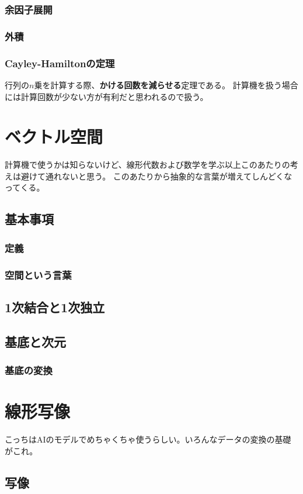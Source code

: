 \documentclass[10pt]{jsreport}
\theoremstyle{definition}%
\numberwithin{equation}{section}%
\begin{document}
\subsubsection{余因子展開}\label{yoinshi}
\subsubsection{外積}
\subsubsection{Cayley-Hamiltonの定理}
行列の$n$乗を計算する際、{\bf かける回数を減らせる}定理である。
計算機を扱う場合には計算回数が少ない方が有利だと思われるので扱う。
\section{ベクトル空間}
計算機で使うかは知らないけど、線形代数および数学を学ぶ以上このあたりの考えは避けて通れないと思う。
このあたりから抽象的な言葉が増えてしんどくなってくる。
\subsection{基本事項}
\subsubsection{定義}
\subsubsection{空間という言葉}
\subsection{1次結合と1次独立}
\subsection{基底と次元}
\subsubsection{基底の変換}
\section{線形写像}
こっちはAIのモデルでめちゃくちゃ使うらしい。いろんなデータの変換の基礎がこれ。
\subsection{写像}
\end{document}
